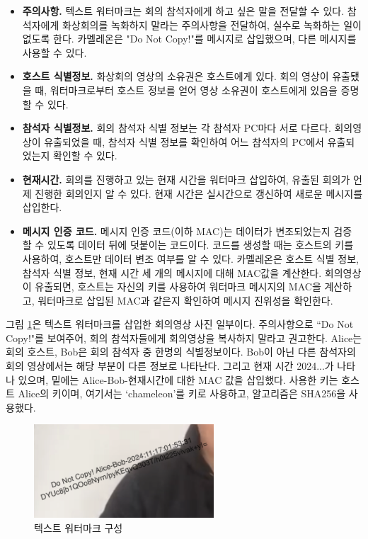 \begin{itemize}
    \item \textbf{주의사항.} 텍스트 워터마크는 회의 참석자에게 하고 싶은 말을
    전달할 수 있다. 참석자에게 화상회의를 녹화하지 말라는 주의사항을 전달하여,
    실수로 녹화하는 일이 없도록 한다. 카멜레온은 "Do Not Copy!"를 메시지로
    삽입했으며, 다른 메시지를 사용할 수 있다.
    \item \textbf{호스트 식별정보.} 화상회의 영상의 소유권은 호스트에게 있다.
    회의 영상이 유출됐을 때, 워터마크로부터 호스트 정보를 얻어 영상 소유권이
    호스트에게 있음을 증명할 수 있다. 
    \item \textbf{참석자 식별정보.} 회의 참석자 식별 정보는 각 참석자 PC마다
    서로 다르다. 회의영상이 유출되었을 때, 참석자 식별 정보를 확인하여 어느
    참석자의 PC에서 유출되었는지 확인할 수 있다.
    \item \textbf{현재시간.} 회의를 진행하고 있는 현재 시간을 워터마크 삽입하여,
    유출된 회의가 언제 진행한 회의인지 알 수 있다. 현재 시간은 실시간으로
    갱신하여 새로운 메시지를 삽입한다.
    \item \textbf{메시지 인증 코드.} 메시지 인증 코드(이하 MAC)는 데이터가
    변조되었는지 검증 할 수 있도록 데이터 뒤에 덧붙이는 코드이다. 코드를 생성할
    때는 호스트의 키를 사용하여, 호스트만 데이터 변조 여부를 알 수 있다.
    카멜레온은 호스트 식별 정보, 참석자 식별 정보, 현재 시간 세 개의 메시지에
    대해 MAC값을 계산한다. 회의영상이 유출되면, 호스트는 자신의 키를 사용하여
    워터마크 메시지의 MAC을 계산하고, 워터마크로 삽입된 MAC과 같은지 확인하여
    메시지 진위성을 확인한다.
\end{itemize}

그림 \ref{fig:text_wm}은 텍스트 워터마크를 삽입한 회의영상 사진 일부이다.
주의사항으로 ``Do Not Copy!"를 보여주어, 회의 참석자들에게 회의영상을 복사하지
말라고 권고한다. Alice는 회의 호스트, Bob은 회의 참석자 중 한명의 식별정보이다.
Bob이 아닌 다른 참석자의 회의 영상에서는 해당 부분이 다른 정보로 나타난다.
그리고 현재 시간 2024...가 나타나 있으며, 밑에는 Alice-Bob-현재시간에 대한 MAC
값을 삽입했다. 사용한 키는 호스트 Alice의 키이며, 여기서는 `chameleon'를 키로
사용하고, 알고리즘은 SHA256을 사용했다.
\begin{figure}[ht]
    \vspace{10pt}
    \centering
    \includegraphics[width=0.6\textwidth]{imgs/text_wm.png}  %
    \caption{텍스트 워터마크 구성}
    \label{fig:text_wm}
\end{figure} 


